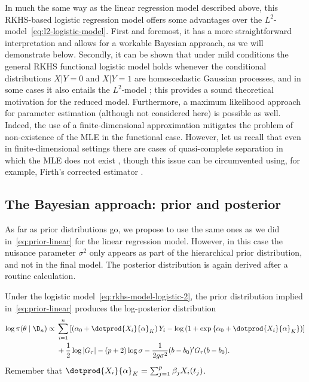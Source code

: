 In much the same way as the linear regression model described above, this RKHS-based logistic regression model offers some advantages over the \(L^2\)-model~\eqref{eq:l2-logistic-model}. First and foremost, it has a more straightforward interpretation and allows for a workable Bayesian approach, as we will demonstrate below. Secondly, it can be shown that under mild conditions the general RKHS functional logistic model holds whenever the conditional distributions \(X | Y=0\) and \(X|Y=1\) are homoscedastic Gaussian processes, and in some cases it also entails the \(L^2\)-model \citep[see Theorem 1 in][]{berrendero2018functional}; this provides a sound theoretical motivation for the reduced model. Furthermore, a maximum likelihood approach for parameter estimation (although not considered here) is possible as well. Indeed, the use of a finite-dimensional approximation  mitigates the problem of non-existence of the MLE in the functional case. However, let us recall that even in finite-dimensional settings there are cases of quasi-complete separation in which the MLE does not exist \citep{albert1984existence}, though this issue can be circumvented using, for example, Firth's corrected estimator \citep{firth1993bias}.

\subsection*{The Bayesian approach: prior and posterior}

As far as prior distributions go, we propose to use the same ones as we did in~\eqref{eq:prior-linear} for the linear regression model. However, in this case the nuisance parameter \(\sigma^2\) only appears as part of the hierarchical prior distribution, and not in the final model. The posterior distribution is again derived after a routine calculation.

\begin{proposition}
Under the logistic model~\eqref{eq:rkhs-model-logistic-2}, the prior distribution implied in~\eqref{eq:prior-linear} produces the log-posterior distribution
\begin{align*}
  \log \pi(\theta \mid \D_n) \propto {} & \sum_{i=1}^n \left[ \left(\alpha_0 + \dotprod{X_i}{\alpha}_K\right)Y_i - \log\left(1 + \exp\left\{\alpha_0 + \dotprod{X_i}{\alpha}_K\right\}\right)\right]\\
  \quad &+ \frac{1}{2}\log |G_\tau| - (p+2)\log \sigma -\frac{1}{2g\sigma^2} (b - b_0)'G_\tau(b - b_0).
\end{align*}
Remember that \(\dotprod{X_i}{\alpha}_K = \sum_{j=1}^p \beta_j X_i(t_j)\).
\end{proposition}


